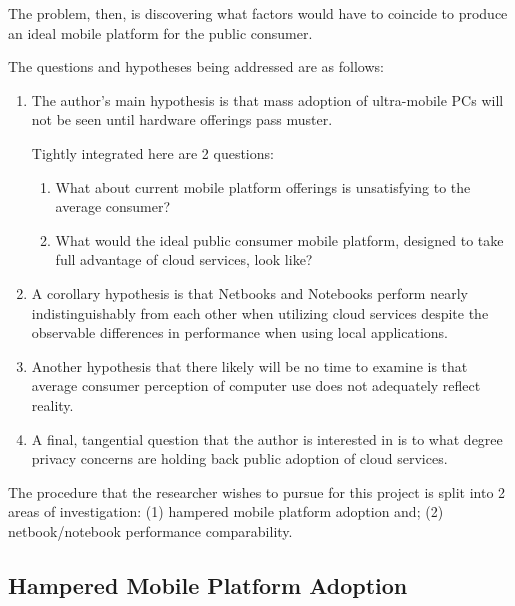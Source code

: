 The problem, then, is discovering what factors would have to coincide to produce
an ideal mobile platform for the public consumer.

The questions and hypotheses being addressed are as follows:

\begin{enumerate}

  \item The author's main hypothesis is that mass adoption of ultra-mobile PCs
    will not be seen until hardware offerings pass muster.

  Tightly integrated here are 2 questions:

  \begin{enumerate}

    \item What about current mobile platform offerings is unsatisfying to the
      average consumer?

    \item What would the ideal public consumer mobile platform, designed to take
      full advantage of cloud services, look like?

  \end{enumerate}

  \item A corollary hypothesis is that Netbooks and Notebooks perform nearly
    indistinguishably from each other when utilizing cloud services despite the
    observable differences in performance when using local applications.

  \item Another hypothesis that there likely will be no time to examine is that
    average consumer perception of computer use does not adequately reflect
    reality.

  \item A final, tangential question that the author is interested in is to what
    degree privacy concerns are holding back public adoption of cloud services.

\end{enumerate}

The procedure that the researcher wishes to pursue for this project is split
into 2 areas of investigation: (1) hampered mobile platform adoption and; (2)
netbook/notebook performance comparability.

\subsection{Hampered Mobile Platform Adoption}

